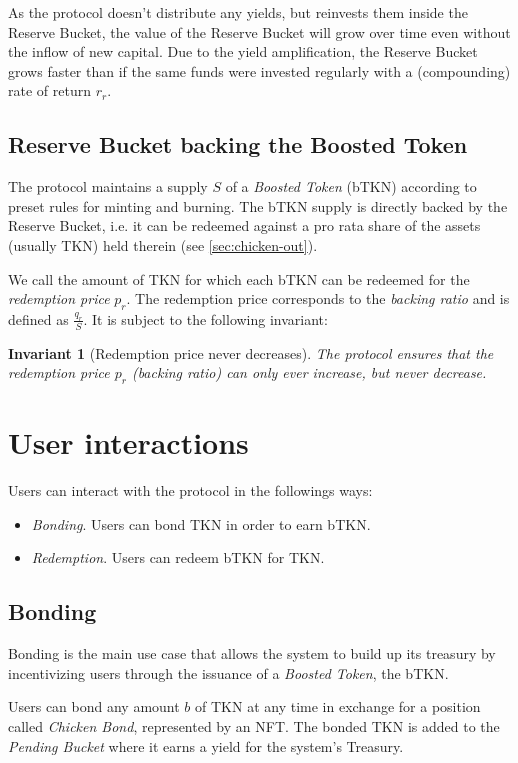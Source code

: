 \documentclass{article}
\newtheorem*{invariant}{Invariant}
\begin{document}
As the protocol doesn't distribute any yields, but reinvests them inside the Reserve Bucket, the value of the Reserve Bucket will grow over time even without the inflow of new capital. Due to the yield amplification, the Reserve Bucket grows faster than if the same funds were invested regularly with a (compounding) rate of return $r_r$.

\subsection{Reserve Bucket backing the Boosted Token}
The protocol maintains a supply $S$ of a \textit{Boosted Token} (bTKN) according to preset rules for minting and burning. The bTKN supply is directly backed by the Reserve Bucket, i.e. it can be redeemed against a pro rata share of the assets (usually TKN) held therein (see \ref{sec:chicken-out}).

We call the amount of TKN for which each bTKN can be redeemed for the \textit{redemption price} $p_r$. The redemption price  corresponds to the \textit{backing ratio} and is defined as $\frac{q_r}{S}$. It is subject to the following invariant:

\begin{invariant}[Redemption price never decreases]
The protocol ensures that the redemption price $p_r$ (backing ratio) can only ever increase, but never decrease.
\end{invariant}

\section{User interactions}

Users can interact with the protocol in the followings ways:
\begin{itemize}
    \item \textit{Bonding}. Users can bond TKN in order to earn bTKN.
    \item \textit{Redemption}. Users can redeem bTKN for TKN.
\end{itemize}

\subsection{Bonding}
Bonding is the main use case that allows the system to build up its treasury by incentivizing users through the issuance of a  \textit{Boosted Token}, the bTKN. 

Users can bond any amount $b$ of TKN at any time in exchange for a position called \textit{Chicken Bond}, represented by an NFT. The bonded TKN is added to the \textit{Pending Bucket} where it earns a yield for the system's Treasury.
\end{document}
